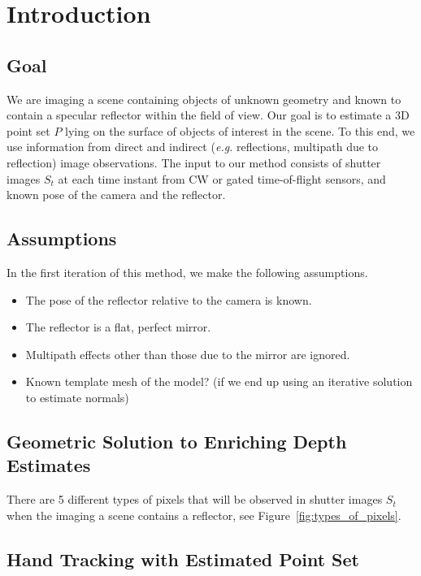 \section{Introduction}

\subsection{Goal}
We are imaging a scene containing objects of unknown geometry and known to contain a specular reflector within the field of view.
Our goal is to estimate a 3D point set $P$ lying on the surface of objects of interest in the scene.
To this end, we use information from direct and indirect (\emph{e.g.} reflections, multipath due to reflection) image observations.
The input to our method consists of shutter images $S_t$ at each time instant from CW or gated time-of-flight sensors, and known pose of the camera and the reflector.

\subsection{Assumptions}
In the first iteration of this method, we make the following assumptions.
\begin{itemize}
\item The pose of the reflector relative to the camera is known.
\item The reflector is a flat, perfect mirror.
\item Multipath effects other than those due to the mirror are ignored.
\item Known template mesh of the model? (if we end up using an iterative solution to estimate normals)
\end{itemize}

\subsection{Geometric Solution to Enriching Depth Estimates}
There are 5 different types of pixels that will be observed in shutter images $S_t$ when the imaging a scene contains a reflector, see Figure~\ref{fig:types_of_pixels}.

\subsection{Hand Tracking with Estimated Point Set}

